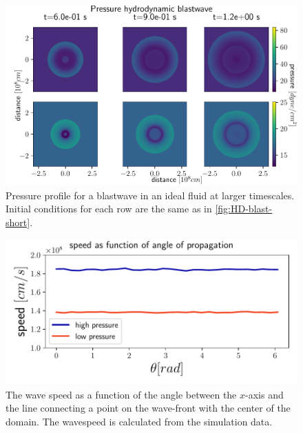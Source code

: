 \begin{figure}[h]
	\centering
	\includegraphics[width=\linewidth]{images/HD-blast-prs-2.pdf}
	\caption{Pressure profile for a blastwave in an ideal fluid at larger timescales. Initial conditions for each row are the same as in \autoref{fig:HD-blast-short}.}
	\label{fig:HD-blast-long}
\end{figure}

\begin{figure}[h]
	\centering
	\includegraphics[width=\linewidth]{images/speed-angle-hd.pdf}
	\caption{The wave speed as a function of the angle between the $x$-axis and the line connecting a point on the wave-front with the center of the domain. The wavespeed is calculated from the simulation data.}
	\label{fig:speed-angle-hd}
\end{figure}

